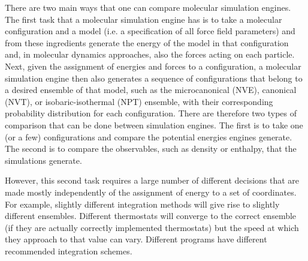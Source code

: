 There are two main ways that one can compare molecular simulation
engines.  The first task that a molecular simulation engine has is to
take a molecular configuration and a model (i.e. a specification of
all force field parameters) and from these ingredients generate the
energy of the model in that configuration and, in molecular dynamics
approaches, also the forces acting on each particle.  Next, given the
assignment of energies and forces to a configuration, a molecular
simulation engine then also generates a sequence of configurations
that belong to a desired ensemble of that model, such as the
microcanonical (NVE), canonical (NVT), or isobaric-isothermal (NPT)
ensemble, with their corresponding probability distribution for each
configuration. There are therefore two types of comparison that can be
done between simulation engines.  The first is to take one (or a few)
configurations and compare the potential energies engines generate.
The second is to compare the observables, such as density or enthalpy,
that the simulations generate.

However, this second task requires a large number of different
decisions that are made mostly independently of the assignment of
energy to a set of coordinates.  For example, slightly different
integration methods will give rise to slightly different
ensembles. Different thermostats will converge to the correct ensemble
(if they are actually correctly implemented thermostats) but the speed
at which they approach to that value can vary. Different programs have
different recommended integration schemes.

